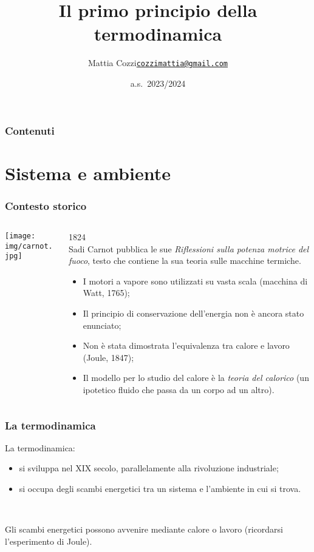 \documentclass[]{beamer}
\title{Il primo principio della termodinamica}
\author{\texorpdfstring{Mattia Cozzi\newline\href{mailto:cozzimattia@gmail.com}{\texttt{cozzimattia@gmail.com}}}{Mattia Cozzi}}
\date{a.s.~2023/2024}
\theoremstyle{plain}
\begin{document}
\begin{frame}
  \titlepage
\end{frame}





\begin{frame}
\frametitle{Contenuti}
\tableofcontents
\end{frame}

\section{Sistema e ambiente}

\begin{frame}
\frametitle{Contesto storico}
\begin{columns}
\begin{column}{0.2\textwidth}
\texttt{[image: img/carnot.jpg]}
\end{column}
\begin{column}{0.7\textwidth}
1824\\Sadi Carnot pubblica le sue \emph{Riflessioni sulla potenza motrice del fuoco}, testo che contiene la sua teoria sulle macchine termiche.\pause

\begin{itemize}
\item<2-> I motori a vapore sono utilizzati su vasta scala (macchina di Watt, 1765);
\item<3-> Il principio di conservazione dell'energia non è ancora stato enunciato;
\item<4-> Non è stata dimostrata l'equivalenza tra calore e lavoro (Joule, 1847);
\item<5-> Il modello per lo studio del calore è la \emph{teoria del calorico} (un ipotetico fluido che passa da un corpo ad un altro).
\end{itemize}
\end{column}
\end{columns}
\end{frame}

\begin{frame}
\frametitle{La termodinamica}
La termodinamica:
\begin{itemize}
  \item si sviluppa nel XIX secolo, parallelamente alla rivoluzione industriale;\pause
  \item si occupa degli scambi energetici tra un \alert<2>{sistema} e l'\alert<2>{ambiente} in cui si trova.\pause
\end{itemize}

~

Gli scambi energetici possono avvenire mediante \alert<3>{calore} o \alert<3>{lavoro} (ricordarsi l'esperimento di Joule).
\end{frame}
\end{document}
